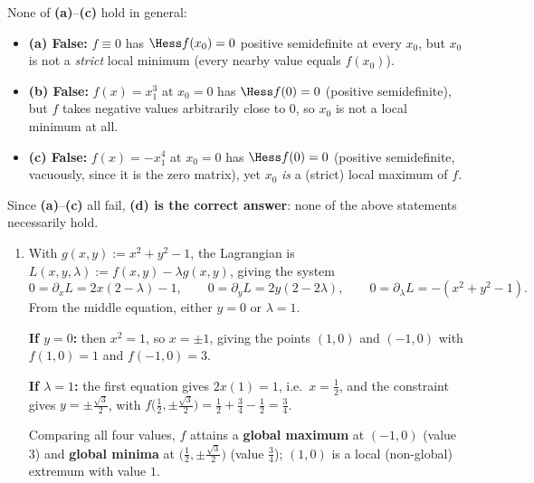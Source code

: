 \begin{exercisesolution}
None of \textbf{(a)}--\textbf{(c)} hold in general:
\begin{itemize}
  \item \textbf{(a) False:} $f \equiv 0$ has $\Hess f(x_0) = 0$ positive semidefinite at every
    $x_0$, but $x_0$ is not a \emph{strict} local minimum (every nearby value equals $f(x_0)$).
  \item \textbf{(b) False:} $f(x) = x_1^3$ at $x_0 = 0$ has $\Hess f(0) = 0$ (positive
    semidefinite), but $f$ takes negative values arbitrarily close to $0$, so $x_0$ is not a
    local minimum at all.
  \item \textbf{(c) False:} $f(x) = -x_1^4$ at $x_0 = 0$ has $\Hess f(0) = 0$ (positive
    semidefinite, vacuously, since it is the zero matrix), yet $x_0$ \emph{is} a (strict) local
    maximum of $f$.
\end{itemize}
Since \textbf{(a)}--\textbf{(c)} all fail, \textbf{(d) is the correct answer}: none of the above
statements necessarily hold.
\end{exercisesolution}

\begin{exercisesolution}
\begin{enumerate}[label=\textbf{(\alph*)}]
  \item With $g(x,y) := x^2+y^2-1$, the Lagrangian is $L(x,y,\lambda) := f(x,y) - \lambda g(x,y)$,
    giving the system
    \[0 = \partial_x L = 2x(2-\lambda) - 1, \qquad 0 = \partial_y L = 2y(2-2\lambda), \qquad 0 = \partial_\lambda L = -(x^2+y^2-1).\]
    From the middle equation, either $y = 0$ or $\lambda = 1$.

    \textbf{If $y = 0$:} then $x^2 = 1$, so $x = \pm 1$, giving the points $(1,0)$ and $(-1,0)$
    with $f(1,0) = 1$ and $f(-1,0) = 3$.

    \textbf{If $\lambda = 1$:} the first equation gives $2x(1) = 1$, i.e.\ $x = \tfrac12$, and the
    constraint gives $y = \pm\tfrac{\sqrt3}{2}$, with $f\big(\tfrac12,\pm\tfrac{\sqrt3}{2}\big) =
    \tfrac12 + \tfrac34 - \tfrac12 = \tfrac34$.

    Comparing all four values, $f$ attains a \textbf{global maximum} at $(-1,0)$ (value $3$) and
    \textbf{global minima} at $\big(\tfrac12,\pm\tfrac{\sqrt3}{2}\big)$ (value $\tfrac34$); $(1,0)$
    is a local (non-global) extremum with value $1$.
  \end{enumerate}
\end{exercisesolution}


